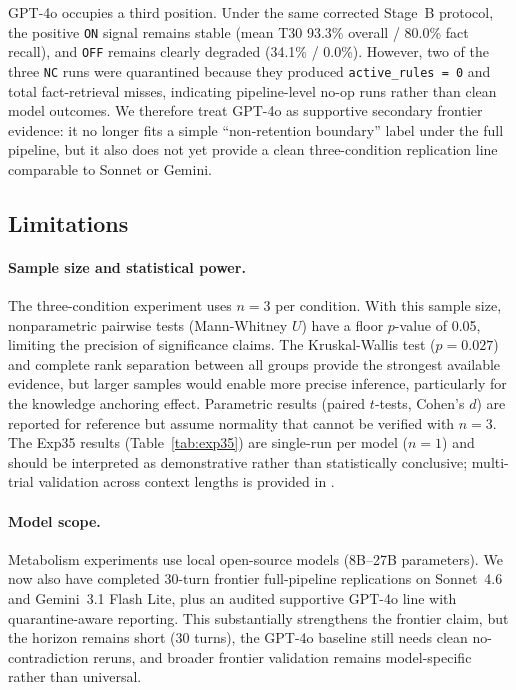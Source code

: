 \documentclass[11pt,a4paper]{article}
\begin{document}
GPT-4o occupies a third position. Under the same corrected Stage~B protocol, the positive \texttt{ON} signal remains stable (mean T30 93.3\% overall / 80.0\% fact recall), and \texttt{OFF} remains clearly degraded (34.1\% / 0.0\%). However, two of the three \texttt{NC} runs were quarantined because they produced \texttt{active\_rules = 0} and total fact-retrieval misses, indicating pipeline-level no-op runs rather than clean model outcomes. We therefore treat GPT-4o as supportive secondary frontier evidence: it no longer fits a simple ``non-retention boundary'' label under the full pipeline, but it also does not yet provide a clean three-condition replication line comparable to Sonnet or Gemini.

\subsection{Limitations}

\paragraph{Sample size and statistical power.}
The three-condition experiment uses $n = 3$ per condition.
With this sample size, nonparametric pairwise tests (Mann-Whitney $U$) have a floor $p$-value of 0.05, limiting the precision of significance claims.
The Kruskal-Wallis test ($p = 0.027$) and complete rank separation between all groups provide the strongest available evidence, but larger samples would enable more precise inference, particularly for the knowledge anchoring effect.
Parametric results (paired $t$-tests, Cohen's $d$) are reported for reference but assume normality that cannot be verified with $n = 3$.
The Exp35 results (Table~\ref{tab:exp35}) are single-run per model ($n = 1$) and should be interpreted as demonstrative rather than statistically conclusive; multi-trial validation across context lengths is provided in \citet{sunagawa2026collapse}.

\paragraph{Model scope.}
Metabolism experiments use local open-source models (8B--27B parameters).
We now also have completed 30-turn frontier full-pipeline replications on Sonnet~4.6 and Gemini~3.1 Flash Lite, plus an audited supportive GPT-4o line with quarantine-aware reporting. This substantially strengthens the frontier claim, but the horizon remains short (30 turns), the GPT-4o baseline still needs clean no-contradiction reruns, and broader frontier validation remains model-specific rather than universal.
\end{document}
